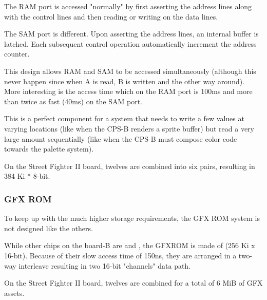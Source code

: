 The RAM port is accessed "normally" by first asserting the address lines along with the control lines and then reading or writing on the data lines.

The SAM port is different. Upon asserting the address lines, an internal buffer is latched. Each subsequent control operation automatically increment the address counter.

This design allows RAM and SAM to be accessed simultaneously (although this never happen since when A is read, B is written and the other way around).
 More interesting is the access time which on the RAM port is 100ms and more than twice as fast (40ms) on the SAM port. 

 This is a perfect component for a system that needs to write a few values at varying locations (like when the CPS-B renders a sprite buffer) but read a very large amount sequentially (like when the CPS-B must compose color code towards the palette system).

 On the Street Fighter II board, twelves  are combined into six pairs, resulting in 384 Ki * 8-bit.







\subsubsection{GFX ROM}
To keep up with the much higher storage requirements, the GFX ROM system is not designed like the others. 

While other chips on the board-B are  and , the GFXROM is made of  (256 Ki x 16-bit). Because of their slow access time of 150ns, they are arranged in a two-way interleave resulting in two 16-bit "channels" data path.



On the Street Fighter II board, twelves  are combined for a total of 6 MiB of GFX assets.

